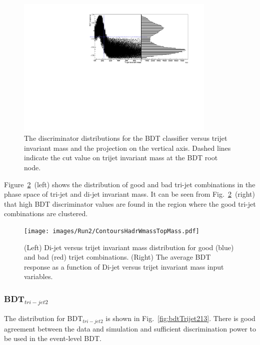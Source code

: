 \begin{figure}[ht!]
\begin{center}
    \includegraphics[width=0.85\textwidth]{images/Run2/multimode.pdf}
    \caption{The discriminator distributions for the BDT classifier versus trijet invariant mass and the projection on the vertical axis. Dashed lines indicate the cut value on trijet invariant mass at the BDT root node.}
    \label{fig:multimode13}
\end{center}
\end{figure}

Figure~\ref{fig:ContoursTopMassHadrWmass13}~(left) shows the distribution of good and bad tri-jet combinations in the phase space of tri-jet and di-jet invariant mass. It can be seen from Fig.~\ref{fig:ContoursTopMassHadrWmass13}~(right) that high BDT discriminator values are found in the region where the good tri-jet combinations are clustered.
\begin{figure}[ht!]
\begin{center}
    \texttt{[image: images/Run2/ContoursHadrWmassTopMass.pdf]}
    \caption{(Left)  Di-jet versus trijet invariant mass distribution for good (blue) and bad (red) trijet combinations. (Right) The average BDT response as a function of Di-jet versus trijet invariant mass input variables.}
    \label{fig:ContoursTopMassHadrWmass13}
\end{center}
\end{figure}

\subsubsection*{BDT$_{tri-jet2}$}

The distribution for BDT$_{tri-jet2}$ is shown in Fig.~\ref{fig:bdtTrijet213}. There is good agreement between the data and simulation and sufficient discrimination power to be used in the event-level BDT.


